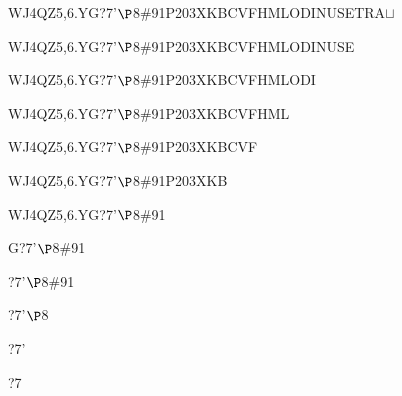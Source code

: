 \documentclass[12pt]{article}
\begin{document}
\begin{tt}
\begin{small}
\begin{bundle}{}
{\begin{bundle}{WJ4QZ5,6.YG?7'$\P$8\#91P203XKBCVFHMLODINUSETRA$\sqcup$}
{\begin{bundle}{WJ4QZ5,6.YG?7'$\P$8\#91P203XKBCVFHMLODINUSE}
{\begin{bundle}{WJ4QZ5,6.YG?7'$\P$8\#91P203XKBCVFHMLODI}
{\begin{bundle}{WJ4QZ5,6.YG?7'$\P$8\#91P203XKBCVFHML}
{\begin{bundle}{WJ4QZ5,6.YG?7'$\P$8\#91P203XKBCVF}
{\begin{bundle}{WJ4QZ5,6.YG?7'$\P$8\#91P203XKB}
{\begin{bundle}{WJ4QZ5,6.YG?7'$\P$8\#91}
{\begin{bundle}{G?7'$\P$8\#91}
{\begin{bundle}{?7'$\P$8\#91}
{\begin{bundle}{?7'$\P$8}
{\begin{bundle}{?7'}
{\begin{bundle}{?7}
\end{bundle}}
\end{bundle}}
\end{bundle}}
\end{bundle}}
\end{bundle}}
\end{bundle}}
\end{bundle}}
\end{bundle}}
\end{bundle}}
\end{bundle}}
\end{bundle}}
\end{bundle}}
\end{bundle}
\end{small}
\end{tt}
\end{document}
